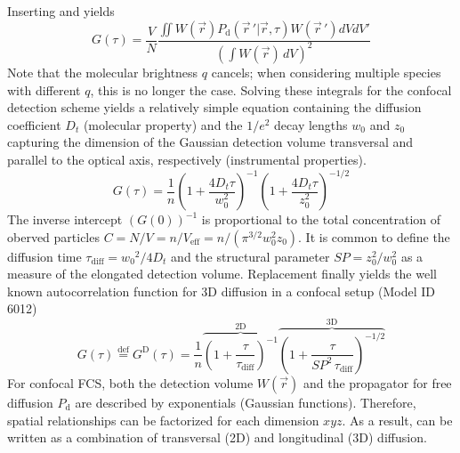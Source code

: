 Inserting  and  yields
	\begin{equation}
	\label{eq8}
	G(\tau) = \frac{V}{N} \frac{\iint W(\vec{r}) P_\mathrm{d} \left( \vec{r} \,' | \vec{r},\tau \right) W(\vec{r} \,') dVdV'}{\left( \int W(\vec{r}) \,dV \right)^2}
	\end{equation}
Note that the molecular brightness $q$ cancels; when considering multiple species with different $q$, this is no longer the case.
Solving these integrals for the confocal detection scheme yields a relatively simple equation containing the diffusion coefficient $D_t$ (molecular property) and the $1/e^2$ decay lengths $w_0$ and $z_0$ capturing the dimension of the Gaussian detection volume transversal and parallel to the optical axis, respectively (instrumental properties).
	\begin{equation}
	\label{eq9}
	G(\tau) = \frac{1}{n} \left(1+\frac{4 D_t \tau}{w_0^2} \right) ^{-1} \left(1+\frac{4D_t \tau}{z_0^2} \right)^{-1/2}
	\end{equation}
The inverse intercept $(G(0))^{-1}$ is proportional to the total concentration of oberved particles $C = N/V =  n/V_{\mathrm{eff}} = n/ (\pi^{3/2}w_0^2z_0)$. It is common to define the diffusion time $\tau_{\mathrm{diff}} = {w_0}^2/4D_t$ and the structural parameter $\textit{SP}=z_0^2/w_0^2$ as a measure of the elongated detection volume. Replacement finally yields the well known autocorrelation function for 3D diffusion in a confocal setup (Model ID 6012)
	\begin{equation}
	\label{eq10}
	G(\tau) \stackrel{\mathrm{def}}{=} G^{\mathrm{D}}(\tau) = \frac{1}{n} \overbrace{ \left(1+\frac{\tau}{\tau_{\mathrm{diff}}} \right) ^{-1}}^{\mathrm{2D}} \overbrace{ \left(1+\frac{\tau}{\textit{SP}^2 \, \tau_{\mathrm{diff}}} \right)^{-1/2}}^{\mathrm{3D}}
	\end{equation}
For confocal FCS, both the detection volume $W(\vec{r})$ and the propagator for free diffusion $P_\mathrm{d}$ are described by exponentials (Gaussian functions). Therefore, spatial relationships can be factorized for each dimension $xyz$. As a result,  can be written as a combination of transversal (2D) and longitudinal (3D) diffusion.

